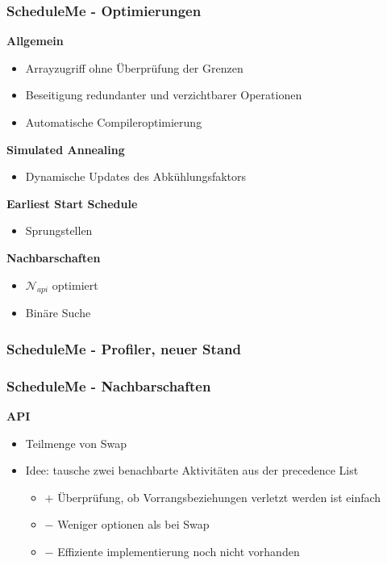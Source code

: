 \documentclass[aspectratio=169]{beamer}
\begin{document}
\begin{frame}[t]
\frametitle{ScheduleMe - Optimierungen}
\vspace{-8pt}
\textbf{Allgemein}
\begin{itemize}
	\item Arrayzugriff ohne Überprüfung der Grenzen
	\item Beseitigung redundanter und verzichtbarer Operationen
	\item Automatische Compileroptimierung
\end{itemize}
\vspace{6pt}
\textbf{Simulated Annealing}
\begin{itemize}
	\item Dynamische Updates des Abkühlungsfaktors
\end{itemize}
\vspace{6pt}
\textbf{Earliest Start Schedule}
\begin{itemize}
	\item Sprungstellen
\end{itemize}
\vspace{6pt}
\textbf{Nachbarschaften}
\begin{itemize}
	\item $\mathcal{N}_{api}$ optimiert
	\item Binäre Suche
\end{itemize}
\end{frame}


\begin{frame}
\frametitle{ScheduleMe - Profiler, neuer Stand}
\end{frame}


\begin{frame}
\frametitle{ScheduleMe - Nachbarschaften}
\textbf{API}
\begin{itemize}
	\item Teilmenge von Swap
	\item Idee: tausche zwei benachbarte Aktivitäten aus der precedence List
	\begin{itemize}
		\item $+$ Überprüfung, ob Vorrangsbeziehungen verletzt werden ist einfach
		\item $-$  Weniger optionen als bei Swap
		\item $-$  Effiziente implementierung noch nicht vorhanden
	\end{itemize}
\end{itemize}
\end{frame}
\end{document}
